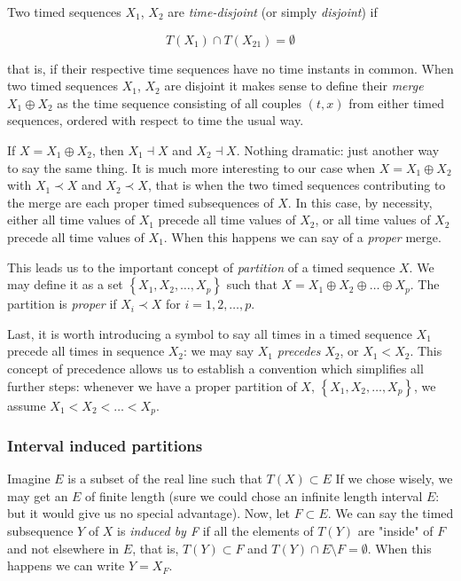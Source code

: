 \documentclass[a4paper,10pt]{book}
\begin{document}
Two timed sequences $X_{1}$, $X_{2}$ are \emph{time-disjoint} (or simply \emph{disjoint}) if

\begin{equation}\label{eq:Time disjoint timed sequences}
	T(X_{1}) \cap T(X_{21}) = \emptyset
\end{equation}

\noindent that is, if their respective time sequences have no time instants in common. When two timed sequences $X_{1}$, $X_{2}$ are disjoint it makes sense to define their \emph{merge} $X_{1} \oplus X_{2}$ as the time sequence consisting of all couples $(t,x)$ from either timed sequences, ordered with respect to time the usual way.

If $X = X_{1} \oplus X_{2}$, then $X_{1} \dashv X$ and $X_{2} \dashv X$. Nothing dramatic: just another way to say the same thing. It is much more interesting to our case when $X = X_{1} \oplus X_{2}$ with $X_{1} \prec X$ and $X_{2} \prec X$, that is when the two timed sequences contributing to the merge are each proper timed subsequences of $X$. In this case, by necessity, either all time values of $X_{1}$ precede all time values of $X_{2}$, or all time values of $X_{2}$ precede all time values of $X_{1}$. When this happens we can say of a \emph{proper} merge.

This leads us to the important concept of \emph{partition} of a timed sequence $X$. We may define it as a set $\left\{X_{1}, X_{2}, \ldots, X_{p}\right\}$ such that $X = X_{1} \oplus X_{2} \oplus \ldots \oplus X_{p}$. The partition is \emph{proper} if $X_{i} \prec X$ for $i = 1, 2, \ldots, p$.

Last, it is worth introducing a symbol to say all times in a timed sequence $X_{1}$ precede all times in sequence $X_{2}$: we may say $X_{1}$ \emph{precedes} $X_{2}$, or $X_{1} < X_{2}$. This concept of precedence allows us to establish a convention which simplifies all further steps: whenever we have a proper partition of $X$, $\left\{X_{1}, X_{2}, \ldots, X_{p}\right\}$, we assume $X_{1} < X_{2} < \ldots < X_{p}$.


\subsubsection{Interval induced partitions}

Imagine $E$ is a subset of the real line such that $T(X) \subset E$ If we chose wisely, we may get an $E$ of finite length (sure we could chose an infinite length interval $E$: but it would give us no special advantage). Now, let $F \subset E$. We can say the timed subsequence $Y$ of $X$ is \emph{induced by F} if all the elements of $T(Y)$ are "inside" of $F$ and not elsewhere in $E$, that is, $T(Y) \subset F$ and $T(Y) \cap E \setminus F = \emptyset$. When this happens we can write $Y = X_{F}$.
\end{document}
